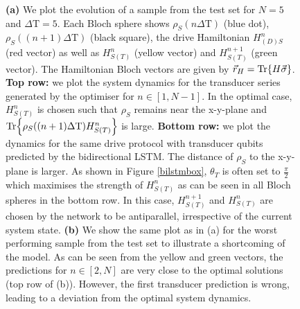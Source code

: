 \begin{figure}[H]
\begin{subfigure}{0.85\textwidth}
	\end{subfigure}
	\caption{\textbf{(a)} We plot the evolution of a sample from the test set for $N=5$ and $\Delta \mathrm{T} = 5$. Each Bloch sphere shows $\rho_S(n \Delta \mathrm{T})$ (blue dot), $\rho_S((n+1) \Delta \mathrm{T})$ (black square), the drive Hamiltonian  $H_{(D)S}^n$ (red vector) as well as $H_{S(T)}^n$ (yellow vector) and $H_{S(T)}^{n+1}$ (green vector). The Hamiltonian Bloch vectors are given by $\vec{r}_H = \Tr{H \vec{\sigma}}$. \textbf{Top row:} we plot the system dynamics for the transducer series generated by the optimiser for $n \in [1, N - 1]$. In the optimal case, $H_{S(T)}^n$ is chosen such that $\rho_S$ remains near the x-y-plane and $\Tr{\rho_S((n+1) \Delta \mathrm{T}) H_{S(T)}^n}$ is large. \textbf{Bottom row:} we plot the dynamics for the same drive protocol with transducer qubits predicted by the bidirectional LSTM. The distance of $\rho_S$ to the x-y-plane is larger. As shown in Figure \ref{bilstmbox}, $\theta_T$ is often set to $\frac{\pi}{2}$ which maximises the strength of $H^n_{S(T)}$ as can be seen in all Bloch spheres in the bottom row. In this case, $H^{n+1}_{S(T)}$ and $H^n_{S(T)}$ are chosen by the network to be antiparallel, irrespective of the current system state.
	\textbf{(b)} We show the same plot as in (a) for the worst performing sample from the test set to illustrate a shortcoming of the model. As can be seen from the yellow and green vectors, the predictions for $n \in [2, N]$ are very close to the optimal solutions (top row of (b)). However, the first transducer prediction is wrong, leading to a deviation from the optimal system dynamics.}
	\label{n_5_blochs}
\end{figure}


